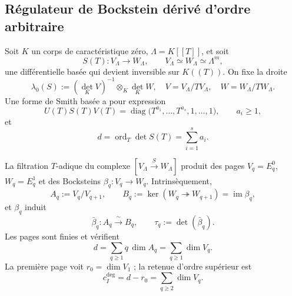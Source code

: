 \subsection*{Régulateur de Bockstein dérivé d'ordre arbitraire}

Soit \(K\) un corps de caractéristique zéro,
\(\Lambda=K[[T]]\), et soit
\begin{equation}\label{eq:bsd-suc-S}
 S(T):V_{\Lambda}\longrightarrow W_{\Lambda},
 \qquad
 V_{\Lambda}\simeq W_{\Lambda}\simeq\Lambda^{m},
\end{equation}
une différentielle basée qui devient inversible sur \(K((T))\). On fixe
la droite
\begin{equation}\label{eq:bsd-suc-lambda0}
 \lambda_0(S):=(\det_K V)^{-1}\otimes_K\det_K W,
 \quad
 V=V_{\Lambda}/TV_{\Lambda},\quad
 W=W_{\Lambda}/TW_{\Lambda}.
\end{equation}
Une forme de Smith basée a pour expression
\begin{equation}\label{eq:bsd-suc-smith}
 U(T)S(T)V(T)
 =\operatorname{diag}
 \bigl(T^{a_1},\ldots,T^{a_s},1,\ldots,1\bigr),
 \qquad a_i\geq1,
\end{equation}
et
\begin{equation}\label{eq:bsd-suc-orden}
 d=\operatorname{ord}_{T}\det S(T)=\sum_{i=1}^{s}a_i.
\end{equation}

La filtration \(T\)-adique du complexe
\([V_{\Lambda}\xrightarrow{S}W_{\Lambda}]\) produit des pages
\(V_q=E_q^0\), \(W_q=E_q^1\) et des Bocksteins
\(\beta_q:V_q\to W_q\). Intrinsèquement,
\begin{equation}\label{eq:bsd-suc-pages}
 A_q:=V_q/V_{q+1},
 \qquad
 B_q:=\ker(W_q\twoheadrightarrow W_{q+1})
      =\operatorname{im}\beta_q,
\end{equation}
et \(\beta_q\) induit
\begin{equation}\label{eq:bsd-suc-beta-q}
 \bar\beta_q:A_q\xrightarrow{\ \sim\ }B_q,
 \qquad
 \tau_q:=\det(\bar\beta_q).
\end{equation}
Les pages sont finies et vérifient
\begin{equation}\label{eq:bsd-suc-carry-orden}
 d=\sum_{q\geq1}q\,\dim A_q
  =\sum_{q\geq1}\dim V_q.
\end{equation}
La première page voit
\(r_0=\dim V_1\) ; la retenue d'ordre supérieur est
\begin{equation}\label{eq:bsd-suc-carry-superior}
 c_I^{\deg}=d-r_0=\sum_{q\geq2}\dim V_q.
\end{equation}

